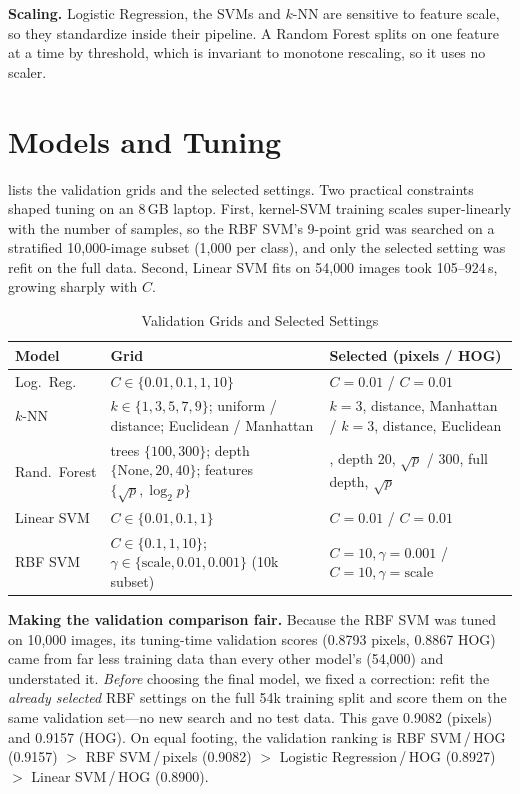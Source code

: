 \documentclass[conference]{IEEEtran}
\begin{document}
\textbf{Scaling.} Logistic Regression, the SVMs and $k$-NN are sensitive to feature scale, so they standardize inside
their pipeline. A Random Forest splits on one feature at a time by threshold, which is invariant to monotone rescaling,
so it uses no scaler.

\section{Models and Tuning}
\label{sec:models}
 lists the validation grids and the selected settings. Two practical constraints shaped tuning on an
8\,GB laptop. First, kernel-SVM training scales super-linearly with the number of samples, so the RBF SVM's 9-point grid
was searched on a stratified 10{,}000-image subset (1{,}000 per class), and only the selected setting was refit on the
full data. Second, Linear SVM fits on 54{,}000 images took 105--924\,s, growing sharply with $C$.

\begin{table}[t]
  \centering
  \caption{Validation Grids and Selected Settings}
  \label{tab:grids}
  \setlength{\tabcolsep}{3pt}
  \renewcommand{\arraystretch}{1.12}
  \begin{tabular}{@{}>{\raggedright\arraybackslash}p{1.3cm} >{\raggedright\arraybackslash}p{3.15cm} >{\raggedright\arraybackslash}p{3.0cm}@{}}
    \toprule
    Model & Grid & Selected (pixels / HOG) \\
    \midrule
    Log.\ Reg. & $C\in\{0.01,0.1,1,10\}$ & $C=0.01$ / $C=0.01$ \\
    $k$-NN & $k\in\{1,3,5,7,9\}$; uniform / distance; Euclidean / Manhattan
           & $k{=}3$, distance, Manhattan / $k{=}3$, distance, Euclidean \\
    Rand.\ Forest & trees $\{100,300\}$; depth $\{\text{None},20,40\}$; features $\{\sqrt{p},\log_2 p\}$
           & 300, depth 20, $\sqrt{p}$ / 300, full depth, $\sqrt{p}$ \\
    Linear SVM & $C\in\{0.01,0.1,1\}$ & $C=0.01$ / $C=0.01$ \\
    RBF SVM & $C\in\{0.1,1,10\}$; $\gamma\in\{\text{scale},0.01,0.001\}$ (10k subset)
           & $C{=}10,\gamma{=}0.001$ / $C{=}10,\gamma{=}\text{scale}$ \\
    \bottomrule
  \end{tabular}
\end{table}

\textbf{Making the validation comparison fair.} Because the RBF SVM was tuned on 10{,}000 images, its tuning-time
validation scores (0.8793 pixels, 0.8867 HOG) came from far less training data than every other model's (54{,}000) and
understated it. \emph{Before} choosing the final model, we fixed a correction: refit the \emph{already selected} RBF
settings on the full 54k training split and score them on the same validation set---no new search and no test data.
This gave 0.9082 (pixels) and 0.9157 (HOG). On equal footing, the validation ranking is RBF SVM\,/\,HOG (0.9157)
$>$ RBF SVM\,/\,pixels (0.9082) $>$ Logistic Regression\,/\,HOG (0.8927) $>$ Linear SVM\,/\,HOG (0.8900).
\end{document}
